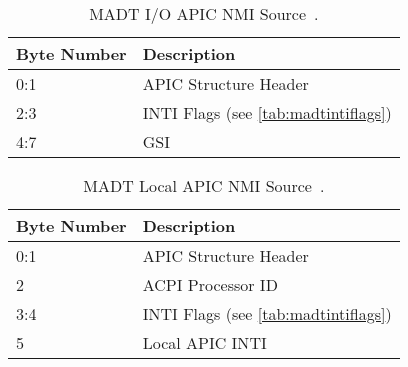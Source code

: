 \begin{table}[H]
  \centering
  \begin{tabularx}{1.0\textwidth}{| X | X |}
    \hline
    \textbf{Byte Number} & \textbf{Description}                                    \\ \hline\hline
    0:1                  & APIC Structure Header                                   \\ \hline
    2:3                  & INTI Flags (see \autoref{tab:madtintiflags})            \\ \hline
    4:7                  & GSI                                                     \\ \hline
  \end{tabularx}
  \caption{MADT I/O APIC NMI Source~\autocite[sec.~5.2.8.3.2]{acpi1}.}
  \label{tab:madtionmi}
\end{table}

\begin{table}[H]
  \centering
  \begin{tabularx}{1.0\textwidth}{| X | X |}
    \hline
    \textbf{Byte Number} & \textbf{Description}                                    \\ \hline\hline
    0:1                  & APIC Structure Header                                   \\ \hline
    2                    & ACPI Processor ID                                       \\ \hline
    3:4                  & INTI Flags (see \autoref{tab:madtintiflags})            \\ \hline
    5                    & Local APIC INTI                                         \\ \hline
  \end{tabularx}
  \caption{MADT Local APIC NMI Source~\autocite[sec.~5.2.8.3.3]{acpi1}.}
  \label{tab:madtlnmi}
\end{table}

\cleardoublepage